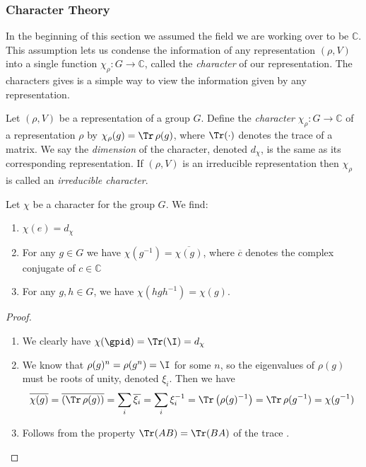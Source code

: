 \documentclass[11pt]{report}
\begin{document}
\subsubsection{Character Theory}

In the beginning of this section we assumed the field we are working 
over to be $\mathbb{C}$. This assumption lets us condense the information of any 
representation $(\rho,V)$ into a single function $\chi_{\rho}:G \to \mathbb{C}$, 
called the \emph{character} of our representation. 
The characters gives is a simple way to view the information given by any 
representation.

\begin{defn}
	Let $(\rho,V)$ be a representation of a group $G$. Define the 
	\emph{character} 
	$\chi_{\rho}:G\to \mathbb{C}$ of a representation $\rho$ by $\chi_{\rho}(g) = \Tr \, 
	\rho(g)$, where $\Tr(\cdot)$ denotes the trace of a matrix. 
	We say the \emph{dimension} of the character, denoted $d_{\chi}$, is the same as its 
	corresponding representation.
	If $(\rho,V)$ is an irreducible representation then $\chi_{\rho}$ is called an 
	\emph{irreducible character}.
\end{defn}


\begin{lemma}
	Let $\chi$ be a character for the group $G$. We find:
	\begin{enumerate}
		\item $\chi(e) = d_{\chi}$
		\item For any $g \in G$ we have  $\chi(g^{-1}) = \overline{\chi(g)}$, 
		where $\overline{c}$ denotes the complex conjugate of $c \in \mathbb{C}$
		\item For any $g,h \in G$, we have $\chi(hgh^{-1}) = \chi(g)$.
	\end{enumerate}
\end{lemma}	

\begin{proof}
	
	
	
	
	
	\begin{enumerate}
		\item We clearly have $\chi(\gpid) = \Tr(\I) = d_{\chi}$
		\item We know that $\rho(g)^{n} = \rho(g^{n}) = \I$ for some $n$, so the eigenvalues of $\rho(g)$ must be roots of unity, denoted $\xi_{i}$. Then we have
		\[\overline{\chi(g)} = \overline{(\Tr \, \rho(g))} = \sum_{i} \overline{\xi_{i}} = \sum_{i}\xi_{i}^{-1} = \Tr \left(\rho(g)^{-1}\right) = \Tr \, \rho(g^{-1}) = \chi(g^{-1}) \]
		\item Follows from the property $\Tr(AB) = \Tr(BA)$ of the trace .
	\end{enumerate}
\end{proof}
\end{document}
